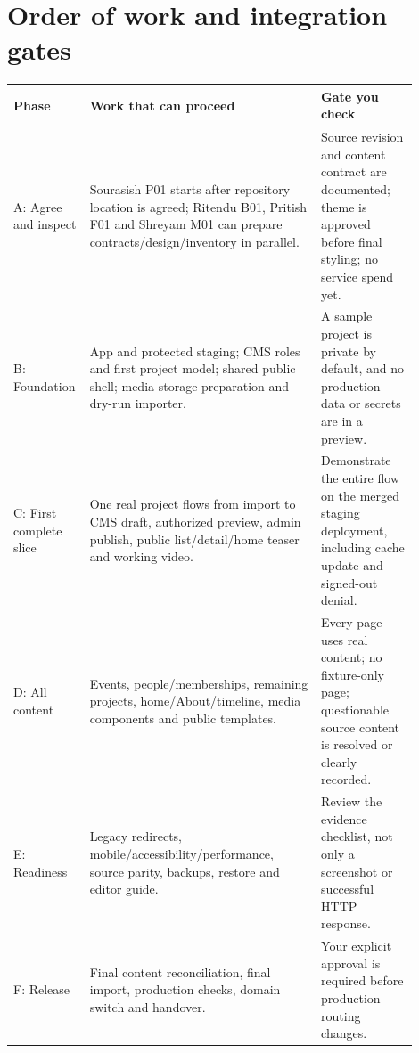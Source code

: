 \documentclass[11pt]{article}
\begin{document}
\section{Order of work and integration gates}
\begin{longtable}{|>{\raggedright\arraybackslash}p{0.12\linewidth}|>{\raggedright\arraybackslash}p{0.55\linewidth}|>{\raggedright\arraybackslash}p{0.23\linewidth}|}
\hline
\textbf{Phase} & \textbf{Work that can proceed} & \textbf{Gate you check} \\
\hline
A: Agree and inspect & Sourasish P01 starts after repository location is agreed; Ritendu B01, Pritish F01 and Shreyam M01 can prepare contracts/design/inventory in parallel. & Source revision and content contract are documented; theme is approved before final styling; no service spend yet. \\
\hline
B: Foundation & App and protected staging; CMS roles and first project model; shared public shell; media storage preparation and dry-run importer. & A sample project is private by default, and no production data or secrets are in a preview. \\
\hline
C: First complete slice & One real project flows from import to CMS draft, authorized preview, admin publish, public list/detail/home teaser and working video. & Demonstrate the entire flow on the merged staging deployment, including cache update and signed-out denial. \\
\hline
D: All content & Events, people/memberships, remaining projects, home/About/timeline, media components and public templates. & Every page uses real content; no fixture-only page; questionable source content is resolved or clearly recorded. \\
\hline
E: Readiness & Legacy redirects, mobile/accessibility/performance, source parity, backups, restore and editor guide. & Review the evidence checklist, not only a screenshot or successful HTTP response. \\
\hline
F: Release & Final content reconciliation, final import, production checks, domain switch and handover. & Your explicit approval is required before production routing changes. \\
\hline
\end{longtable}
\end{document}
